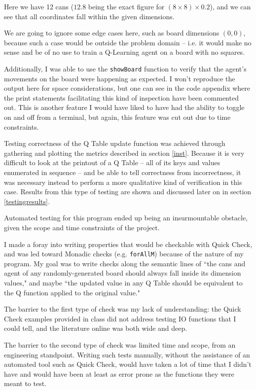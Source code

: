 \documentclass[12pt,a4paper]{article}
\begin{document}
			\par Here we have 12 cans ($12.8$ being the exact figure for $(8 \times 8) \times 0.2$), and we can see that all coordinates fall within the given dimensions.
			\par We are going to ignore some edge cases here, such as board dimensions $(0,0)$, because such a case would be outside the problem domain -- i.e. it would make no sense and be of no use to train a Q-Learning agent on a board with no squares. 
			\par Additionally, I was able to use the \texttt{showBoard} function to verify that the agent's movements on the board were happening as expected. I won't reproduce the output here for space considerations, but one can see in the code appendix where the print statements facilitating this kind of inspection have been commented out. This is another feature I would have liked to have had the ability to toggle on and off from a terminal, but again, this feature was cut out due to time constraints.
			\par Testing correctness of the Q Table update function was achieved through gathering and plotting the metrics described in section \ref{inst}. Because it is very difficult to look at the printout of a Q Table -- all of its keys and values enumerated in sequence -- and be able to tell correctness from incorrectness, it was necessary instead to perform a more qualitative kind of verification in this case. Results from this type of testing are shown and discussed later on in section \ref{testingresults}.
			\par Automated testing for this program ended up being an insurmountable obstacle, given the scope and time constraints of the project. 
			\par I made a foray into writing properties that would be checkable with Quick Check, and was led toward Monadic checks (e.g. \texttt{forAllM}) because of the nature of my program. My goal was to write checks along the semantic lines of ``the cans and agent of any randomly-generated board should always fall inside its dimension values," and maybe ``the updated value in any Q Table should be equivalent to the Q function applied to the original value." 
			\par The barrier to the first type of check was my lack of understanding: the Quick Check examples provided in class did not address testing IO functions that I could tell, and the literature online was both wide and deep. 
			\par The barrier to the second type of check was limited time and scope, from an engineering standpoint. Writing such tests manually, without the assistance of an automated tool such as Quick Check, would have taken a lot of time that I didn't have and would have been at least as error prone as the functions they were meant to test.
			
\end{document}
